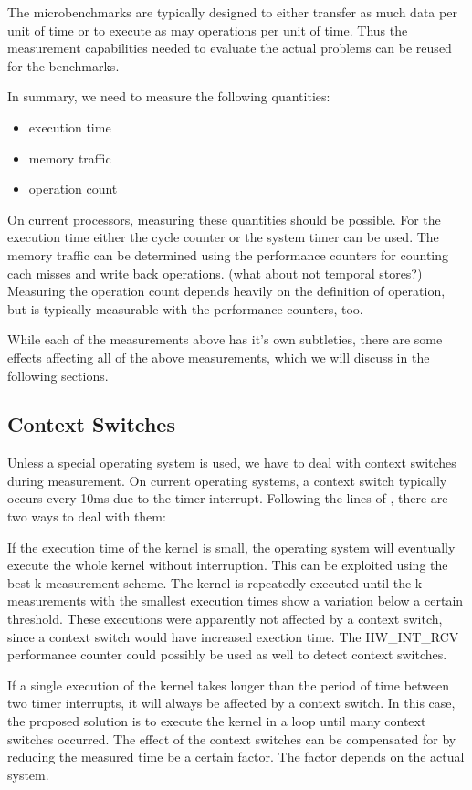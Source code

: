 \documentclass[a4paper,12pt]{article}
\begin{document}
The microbenchmarks are typically designed to either transfer as much data per unit of time or to execute as may operations per unit of time. Thus the measurement capabilities needed to evaluate the actual problems can be reused for the benchmarks. 

In summary, we need to measure the following quantities:
\begin{itemize}
\item execution time
\item memory traffic
\item operation count
\end{itemize}

On current processors, measuring these quantities should be possible. For the execution time either the cycle counter or the system timer can be used. The memory traffic can be determined using the performance counters for counting cach misses and write back operations. (what about not temporal stores?) Measuring the operation count depends heavily on the definition of operation, but is typically measurable with the performance counters, too.

While each of the measurements above has it's own subtleties, there are some effects affecting all of the above measurements, which we will discuss in the following sections.

\subsection{Context Switches}

Unless a special operating system is used, we have to deal with context switches during measurement. On current operating systems, a context switch typically occurs every 10ms due to the timer interrupt. Following the lines of \cite{ComSysProgPersp}, there are two ways to deal with them:

If the execution time of the kernel is small, the operating system will eventually execute the whole kernel without interruption. This can be exploited using the best k measurement scheme. The kernel is repeatedly executed until the k measurements with the smallest execution times show a variation below a certain threshold. These executions were apparently not affected by a context switch, since a context switch would have increased exection time. The HW\_INT\_RCV performance counter could possibly be used as well to detect context switches.

If a single execution of the kernel takes longer than the period of time between two timer interrupts, it will always be affected by a context switch. In this case, the proposed solution is to execute the kernel in a loop until many context switches occurred. The effect of the context switches can be compensated for by reducing the measured time be a certain factor. The factor depends on the actual system.
\end{document}
